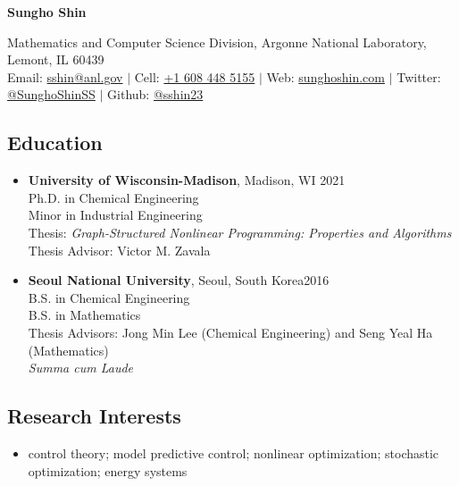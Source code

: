 \documentclass[letterpaper, 11pt]{article}
\begin{document}
\thispagestyle{empty}
\begin{center}
  {\bf\Large Sungho Shin}
\end{center}
\begin{center}
  {Mathematics and Computer Science Division}, {Argonne National Laboratory}, Lemont, IL 60439\\
  Email: \href{mailto:sshin@anl.gov}{sshin@anl.gov} $|$ Cell: \href{tel:16084485155}{+1 608 448 5155} $|$ Web: \href{https://sunghoshin.com}{sunghoshin.com} $|$ Twitter: \href{https://twitter.com/SunghoShinSS}{@SunghoShinSS} $|$ Github: \href{https://github.com/sshin23}{@sshin23}
\end{center}


\subsection*{Education}
\begin{itemize}[leftmargin=*]
\item[]
  {\bf University of Wisconsin-Madison}, Madison, WI \hfill 2021\\
  {Ph.D. in Chemical Engineering} \\
  {Minor in Industrial Engineering}\\
  Thesis: {\it Graph-Structured Nonlinear Programming: Properties and Algorithms}\\
  Thesis Advisor: Victor M. Zavala
\item[]
  {\bf Seoul National University}, Seoul, South Korea\hfill 2016 \\
  {B.S. in Chemical Engineering}\\
  {B.S. in Mathematics}\\
  Thesis Advisors: Jong Min Lee (Chemical Engineering) and Seng Yeal Ha (Mathematics)\\
  {\it Summa cum Laude}
\end{itemize}

\subsection*{Research Interests}
\begin{itemize}[leftmargin=*]
\item[] control theory; model predictive control; nonlinear optimization; stochastic optimization; energy systems
\end{itemize}
\end{document}

